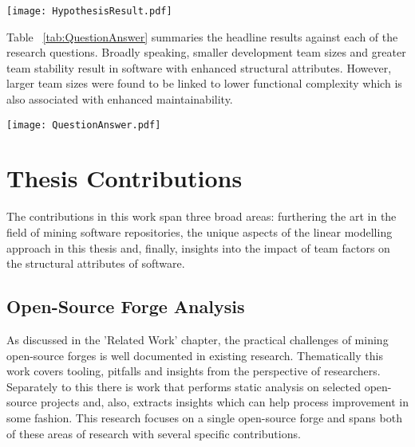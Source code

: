 \begin{table}
\begin{tabular}
 \centering 
 \texttt{[image: HypothesisResult.pdf]}
 \label{tab:HypothesisResult}
\end{tabular}
\end{table}

Table ~\ref{tab:QuestionAnswer} summaries the headline results against each of the research questions. Broadly speaking, smaller development team sizes and greater team stability result in software with enhanced structural attributes. However, larger team sizes were found to be linked to lower functional complexity which is also associated with enhanced maintainability.

\begin{table}
\begin{tabular}
 \centering 
 \texttt{[image: QuestionAnswer.pdf]}
 \label{tab:QuestionAnswer}
\end{tabular}
\end{table}

\section{Thesis Contributions} %
The contributions in this work span three broad areas: furthering the art in the field of mining software repositories, the unique aspects of the linear modelling approach in this thesis and, finally, insights into the impact of team factors on the structural attributes of software.

\subsection{Open-Source Forge Analysis}
As discussed in the 'Related Work' chapter, the practical challenges of mining open-source forges is well documented in existing research. Thematically this work covers tooling, pitfalls and insights from the perspective of researchers. Separately to this there is work that performs static analysis on selected open-source projects and, also, extracts insights which can help process improvement in some fashion. This research focuses on a single open-source forge and spans both of these areas of research with several specific contributions.

